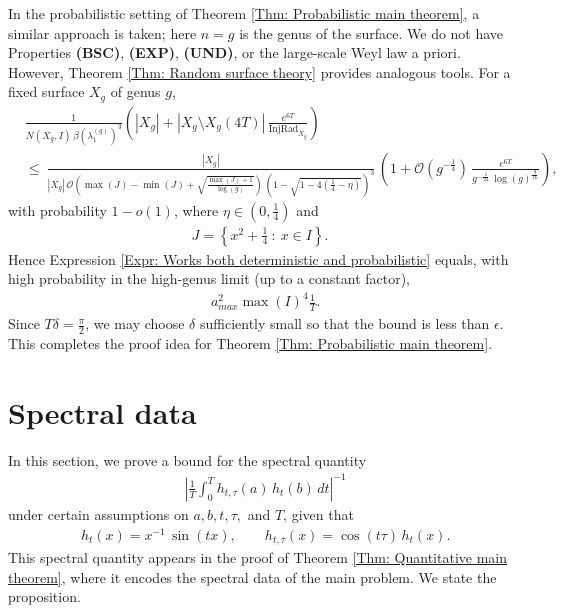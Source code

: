 \documentclass[11pt,twoside,reqno]{amsart} \usepackage{a4wide} \usepackage[T1]{fontenc} \usepackage[utf8]{inputenc} \usepackage{soul}  \usepackage{amsmath} \usepackage{amsfonts} \usepackage{amssymb} \usepackage{mathtools} \usepackage{amsthm} \usepackage{xcolor} \usepackage{graphicx} \usepackage{hyperref} \usepackage{standalone} \usepackage{esint} \usepackage{comment} \usepackage[left=2.3cm,top=3cm,right=2.3cm]{geometry} \usepackage{bm} \usepackage{svg} \usepackage{float} \numberwithin{equation}{section} \theoremstyle{plain} \newtheorem{thm}{Theorem}[section] \newtheorem{theorem}[thm]{Theorem} \newtheorem*{theorem*}{Theorem}\newtheorem{conj}[thm]{Conjecture} \newtheorem{lemma}[thm]{Lemma} \newtheorem{prop}[thm]{Proposition} \newtheorem{proposition}[thm]{Proposition} \newtheorem{cor}[thm]{Corollary} \newtheorem{question}[thm]{Question} \newtheorem{corollary}[thm]{Corollary} \newtheorem{assumption}[thm]{Assumption} \theoremstyle{definition} \newtheorem{defn}[thm]{Definition} \newtheorem{choice}[thm]{Choice} \newtheorem{definition}[thm]{Definition} \newtheorem{ex}[thm]{Example} \newtheorem{notation}[thm]{Notation} \newtheorem*{ack}{Acknowledgements} \theoremstyle{remark} \newtheorem{remark}[thm]{Remark} \newtheorem{bigremark}[thm]{Remark} \usepackage{xcolor} \newcommand{\red}[1]{ {\color{Red}#1} } \newcommand{\blue}[1]{ {\color{Blue}#1} } \author{Kai Hippi} \address{Aalto University, Espoo, Finland} \email{kai.hippi@aalto.fi}
\begin{document}
In the probabilistic setting of Theorem \ref{Thm: Probabilistic main theorem}, a similar approach is taken; here $ n = g $ is the genus of the surface. We do not have Properties \textbf{(BSC)}, \textbf{(EXP)}, \textbf{(UND)}, or the large-scale Weyl law a priori. However, Theorem \ref{Thm: Random surface theory} provides analogous tools. For a fixed surface $X_{g}$ of genus $ g $,
\begin{align*}
	&
		\frac{1}{ N( X_{g}, I ) \, \beta( \lambda_{1}^{( g )} )^{3} } \left( | X_{g} | + | X_{g} \setminus X_{g}( 4T ) | \, \frac{ e^{6T} }{ \operatorname{InjRad}_{X_{g}} } \right)
		\\
		& \leq \
		\frac{| X_{g} |}{ | X_{g} | \, \mathcal{O}\left( \max( J ) - \min( J ) + \sqrt{ \frac{ \max( J  ) + 1 }{ \log( g ) } } \right) \, \left( 1 - \sqrt{1 - 4 ( \tfrac{1}{4} - \eta ) } \right)^{3}} \, \left( 1 + \mathcal{O}( g^{ - \frac{1}{4} } ) \, \frac{e^{6T}}{ g^{ - \frac{1}{24}  } \, \log( g )^{ \frac{9}{16} } } \right),
\end{align*}
with probability $ 1 - o( 1 ) $, where $ \eta \in ( 0, \tfrac{1}{4} ) $ and
\begin{align*}
	J = \left \{ x^{2} + \tfrac{1}{4} \ : \ x \in I \right \}.
\end{align*}
Hence Expression \eqref{Expr: Works both deterministic and probabilistic} equals, with high probability in the high-genus limit (up to a constant factor),
\begin{align*}
	&
	a_{max}^{2} \max( I )^{4} \frac{1}{T}.
\end{align*}
Since \(T\delta=\tfrac{\pi}{2}\), we may choose \(\delta\) sufficiently small so that the bound is less than \(\epsilon\). This completes the proof idea for Theorem \ref{Thm: Probabilistic main theorem}.




\section{Spectral data}
\label{Sec: Spectral data}

\noindent
In this section, we prove a bound for the spectral quantity
\begin{align*}
	&
	\left| \frac{1}{T} \int_{0}^{T} h_{t,\tau}(a)\, h_{t}(b)\, dt \right|^{-1}
\end{align*}
under certain assumptions on $a,b,t,\tau,$ and $T$, given that
\begin{align*}
	&
	h_{t}( x ) = x^{-1} \, \sin( tx ), \qquad h_{t,\tau}( x ) = \cos( t \tau) \, h_{t}( x ).
\end{align*}
This spectral quantity appears in the proof of Theorem \ref{Thm: Quantitative main theorem}, where it encodes the spectral data of the main problem. We state the proposition.
\end{document}
